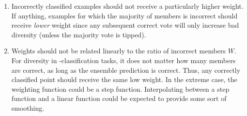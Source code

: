 \documentclass[../main.tex]{subfiles}
\begin{document}
\begin{enumerate}
    \item Incorrectly classified examples should not receive a particularly higher weight. If anything, examples for which the majority of members is incorrect should receive \textit{lower} weight since any subsequent correct vote will only increase bad diversity (unless the majority vote is tipped).
\item Weights should not be related linearly to the ratio of incorrect members $W$. For diversity in \zeroone-classification tasks, it does not matter how many members are correct, as long as the ensemble prediction is correct. Thus, any correctly classified point should receive the same low weight. In the extreme case, the weighting function could be a step function. Interpolating between a step function and a linear function could be expected to provide some sort of smoothing.
\end{enumerate}
\end{document}
